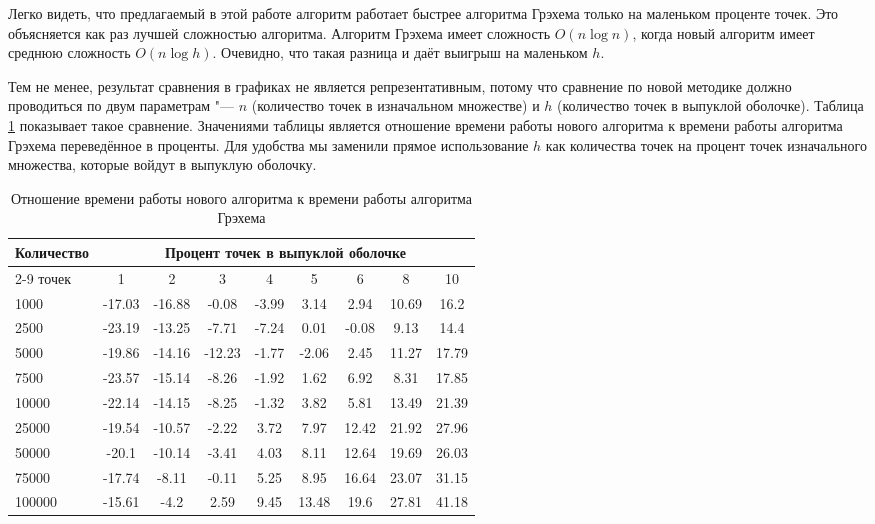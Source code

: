Легко видеть, что предлагаемый в этой работе алгоритм работает быстрее алгоритма Грэхема только на маленьком проценте точек. Это объясняется как раз лучшей сложностью алгоритма. Алгоритм Грэхема имеет сложность $O(n \log n)$, когда новый алгоритм имеет среднюю сложность $O(n \log h)$. Очевидно, что такая разница и даёт выигрыш на маленьком $h$.

Тем не менее, результат сравнения в графиках не является репрезентативным, потому что сравнение по новой методике должно проводиться по двум параметрам "--- $n$ (количество точек в изначальном множестве) и $h$ (количество точек в выпуклой оболочке). Таблица \ref{table:ratio} показывает такое сравнение. Значениями таблицы является отношение времени работы нового алгоритма к времени работы алгоритма Грэхема переведённое в проценты. Для удобства мы заменили прямое использование $h$ как количества точек на процент точек изначального множества, которые войдут в выпуклую оболочку.

\begin{table}[hbt]
	\centering
	\caption{Отношение времени работы нового алгоритма к времени работы алгоритма Грэхема}
	\label{table:ratio}
	\begin{tabular}{|l|c|c|c|c|c|c|c|c|}
\hline
\multirow{2}{*}{Количество} & \multicolumn{8}{c|}{Процент точек в выпуклой оболочке} \\ \cline{2-9}
точек& 1 & 2 & 3 & 4 & 5 & 6 & 8 & 10 \\ \hline
1000  & -17.03 & -16.88 & -0.08 & -3.99 & 3.14  & 2.94  & 10.69 & 16.2  \\ \hline
2500  & -23.19 & -13.25 & -7.71 & -7.24 & 0.01  & -0.08 & 9.13  & 14.4  \\ \hline
5000  & -19.86 & -14.16 & -12.23& -1.77 & -2.06 & 2.45  & 11.27 & 17.79 \\ \hline
7500  & -23.57 & -15.14 & -8.26 & -1.92 & 1.62  & 6.92  & 8.31  & 17.85 \\ \hline
10000 & -22.14 & -14.15 & -8.25 & -1.32 & 3.82  & 5.81  & 13.49 & 21.39 \\ \hline
25000 & -19.54 & -10.57 & -2.22 & 3.72  & 7.97  & 12.42 & 21.92 & 27.96 \\ \hline
50000 & -20.1  & -10.14 & -3.41 & 4.03  & 8.11  & 12.64 & 19.69 & 26.03 \\ \hline
75000 & -17.74 & -8.11  & -0.11 & 5.25  & 8.95  & 16.64 & 23.07 & 31.15 \\ \hline
100000& -15.61 & -4.2   & 2.59  & 9.45  & 13.48 & 19.6  & 27.81 & 41.18 \\ \hline
	\end{tabular}
\end{table}

